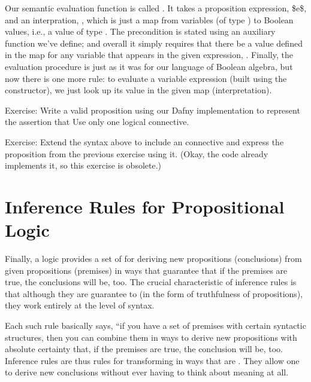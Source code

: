 \documentclass[letterpaper,10pt,english]{sphinxmanual}
\begin{document}
Our semantic evaluation function is called . It takes a
proposition expression, \$e\$, and an interpration, , which is just a
map from variables (of type ) to Boolean values, i.e., a
value of type . The precondition is stated using an
auxiliary function we’ve define; and overall it simply requires that
there be a value defined in the map for any variable that appears in
the given expression, . Finally, the evaluation procedure is just
as it was for our language of Boolean algebra, but now there is one
more rule: to evaluate a variable expression (built using the
 constructor), we just look up its value in the given map
(interpretation).

Exercise: Write a valid proposition using our Dafny implementation to
represent the assertion that  Use only one logical connective.

Exercise: Extend the syntax above to include an  connective
and express the proposition from the previous exercise using it. (Okay,
the code already implements it, so this exercise is obsolete.)


\section{Inference Rules for Propositional Logic}
\label{\detokenize{09-propositional-logic:inference-rules-for-propositional-logic}}
Finally, a logic provides a set of  for deriving new
propositions (conclusions) from given propositions (premises) in ways
that guarantee that if the premises are true, the conclusions will be,
too. The crucial characteristic of inference rules is that although
they are guarantee to  (in the form of truthfulness
of propositions), they work entirely at the level of syntax.

Each such rule basically says, “if you have a set of premises with
certain syntactic structures, then you can combine them in ways to
derive new propositions with absolute certainty that, if the premises
are true, the conclusion will be, too.  Inference rules are thus rules
for transforming  in ways that are . They
allow one to derive  new conclusions without ever having
to think about meaning at all.
\end{document}

